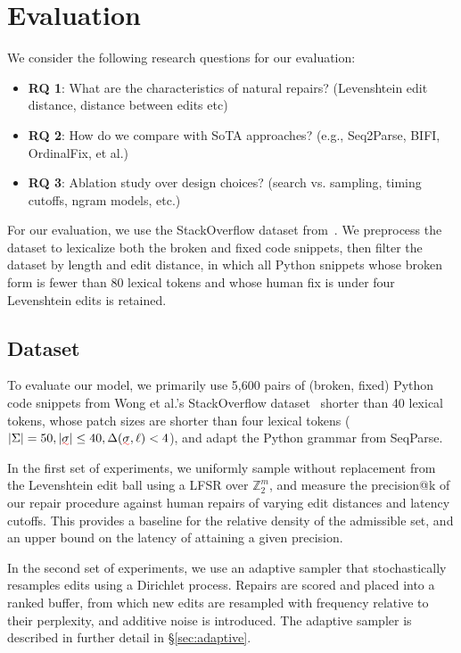\section{Evaluation}

We consider the following research questions for our evaluation:

\begin{itemize}
\item \textbf{RQ 1}: What are the characteristics of natural repairs? (Levenshtein edit distance, distance between edits etc)
\item \textbf{RQ 2}: How do we compare with SoTA approaches? (e.g., Seq2Parse, BIFI, OrdinalFix, et al.)
\item \textbf{RQ 3}: Ablation study over design choices? (search vs. sampling, timing cutoffs, ngram models, etc.)
\end{itemize}

For our evaluation, we use the StackOverflow dataset from~\cite{hindle2012naturalness}. We preprocess the dataset to lexicalize both the broken and fixed code snippets, then filter the dataset by length and edit distance, in which all Python snippets whose broken form is fewer than 80 lexical tokens and whose human fix is under four Levenshtein edits is retained.

\subsection{Dataset}

To evaluate our model, we primarily use 5,600 pairs of (broken, fixed) Python code snippets from Wong et al.'s StackOverflow dataset~\cite{wong2019syntax} shorter than 40 lexical tokens, whose patch sizes are shorter than four lexical tokens ($|\Sigma| = 50, |\err{\sigma}| \leq 40, \Delta(\err{\sigma}, \ell) < 4$), and adapt the Python grammar from SeqParse.

In the first set of experiments, we uniformly sample without replacement from the Levenshtein edit ball using a LFSR over $\mathbb{Z}_2^m$, and measure the precision@k of our repair procedure against human repairs of varying edit distances and latency cutoffs. This provides a baseline for the relative density of the admissible set, and an upper bound on the latency of attaining a given precision.

In the second set of experiments, we use an adaptive sampler that stochastically resamples edits using a Dirichlet process. Repairs are scored and placed into a ranked buffer, from which new edits are resampled with frequency relative to their perplexity, and additive noise is introduced. The adaptive sampler is described in further detail in \S\ref{sec:adaptive}.

